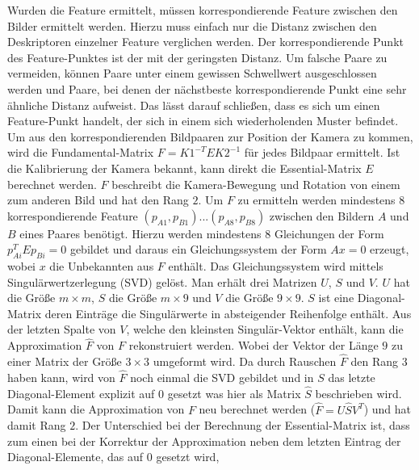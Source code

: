 \documentclass[12pt,titlepage, twoside]{article}
\begin{document}
Wurden die Feature ermittelt, müssen korrespondierende Feature zwischen den Bilder ermittelt werden. Hierzu muss einfach nur die Distanz zwischen den Deskriptoren einzelner Feature verglichen werden. 
Der korrespondierende Punkt des Feature-Punktes ist der mit der geringsten Distanz. Um falsche Paare zu vermeiden, können Paare unter einem gewissen Schwellwert ausgeschlossen werden und 
Paare, bei denen der nächstbeste korrespondierende Punkt eine sehr ähnliche Distanz aufweist. Das lässt darauf schließen, dass es sich um einen Feature-Punkt handelt, der sich in einem sich wiederholenden Muster befindet.
Um aus den korrespondierenden Bildpaaren zur Position der Kamera zu kommen, wird die Fundamental-Matrix $F=K1^{-T}EK2^{-1}$ für jedes Bildpaar ermittelt. 
Ist die Kalibrierung der Kamera bekannt, kann direkt die Essential-Matrix $E$ berechnet werden.
$F$ beschreibt die Kamera-Bewegung und Rotation von einem zum anderen Bild und hat den Rang $2$.
Um $F$ zu ermitteln werden mindestens $8$ korrespondierende Feature $(p_{A1},p_{B1})...(p_{A8},p_{B8})$ zwischen den Bildern $A$ und $B$ eines Paares benötigt. 
Hierzu werden mindestens $8$ Gleichungen der Form $p_{Ai}^TEp_{Bi}=0$ gebildet und daraus ein Gleichungssystem der Form $Ax=0$ erzeugt, wobei $x$ die Unbekannten aus $F$ enthält.
Das Gleichungssystem wird mittels Singulärwertzerlegung (SVD) gelöst. Man erhält drei Matrizen $U$, $S$ und $V$. $U$ hat die Größe $m\times m$, $S$ die Größe $m\times 9$ und $V$ die Größe $9\times 9$.
$S$ ist eine Diagonal-Matrix deren Einträge die Singulärwerte in absteigender Reihenfolge enthält.
Aus der letzten Spalte von $V$, welche den kleinsten Singulär-Vektor enthält, kann die Approximation $\hat{F}$ von $F$ rekonstruiert werden. 
Wobei der Vektor der Länge $9$ zu einer Matrix der Größe $3\times3$ umgeformt wird.
Da durch Rauschen $\hat{F}$ den Rang $3$ haben kann, wird von $\hat{F}$ noch einmal die SVD gebildet und in $S$ das letzte Diagonal-Element explizit auf $0$ gesetzt was hier als Matrix $\hat{S}$ beschrieben wird.
Damit kann die Approximation von $F$ neu berechnet werden ($\hat{F} = U\hat{S}V^T$) und hat damit Rang $2$.
Der Unterschied bei der Berechnung der Essential-Matrix ist, dass zum einen bei der Korrektur der Approximation neben dem letzten Eintrag der Diagonal-Elemente, das auf $0$ gesetzt wird, 
\end{document}
